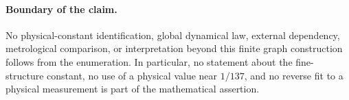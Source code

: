 \paragraph{Boundary of the claim.}
No physical-constant identification, global dynamical law, external dependency, metrological comparison, or interpretation beyond this finite graph construction follows from the enumeration. In particular, no statement about the fine-structure constant, no use of a physical value near \(1/137\), and no reverse fit to a physical measurement is part of the mathematical assertion.
